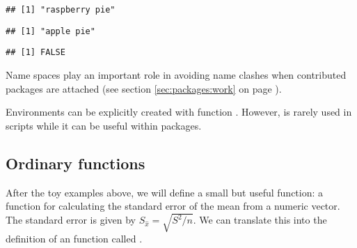 \documentclass[krantz2]{krantz}\usepackage{knitr}
\begin{document}
\begin{knitrout}\footnotesize
{}\color{fgcolor}\begin{kframe}
\begin{alltt}
 \hlkwb{<-} 
\end{alltt}
\begin{verbatim}
## [1] "raspberry pie"
\end{verbatim}
\begin{alltt}
 \hlkwb{<-} 
\end{alltt}
\begin{verbatim}
## [1] "apple pie"
\end{verbatim}
\begin{alltt}
\hlstd{(}\hlstd{)}
\end{alltt}
\begin{verbatim}
## [1] FALSE
\end{verbatim}
\end{kframe}
\end{knitrout}

Name spaces play an important role in avoiding name clashes when contributed packages are attached (see section \ref{sec:packages:work} on page \pageref{sec:packages:work}).

\begin{explainbox}
Environments can be explicitly created with function . However,  is rarely used in scripts while it can be useful within packages.
\end{explainbox}

\subsection{Ordinary functions}\label{sec:functions:sem}\label{sec:ordinary:functions}

After the toy examples above, we will define a small but useful function: a function for calculating the standard error of the mean from a numeric vector. The standard error is given by $S_{\hat{x}} = \sqrt{S^2 / n}$. We can translate this into the definition of an \Rlang function called .

\begin{knitrout}\footnotesize
{}\color{fgcolor}\begin{kframe}
\begin{alltt}
 \hlkwb{<-} \hlstd{(}\hlstd{)\{}\hlstd{(} \hlopt{/} 
\end{alltt}
\end{kframe}
\end{knitrout}
\end{document}
